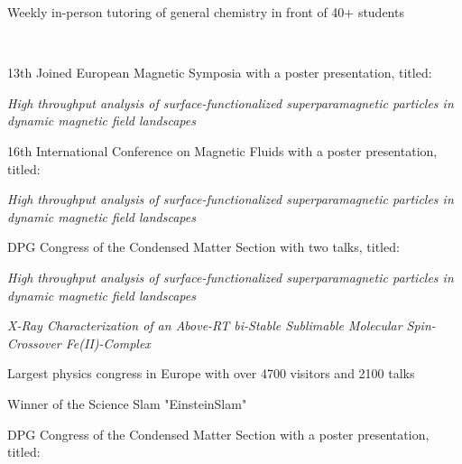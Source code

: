 \begin{adjustwidth}{2.5cm}{1.9cm}
\begin{tightemize}
Weekly in-person tutoring of general chemistry in front of 40+ students
\end{tightemize}

\sectionsep
{} \\
\begin{tightemize} \vspace{-3pt}
\item 13th Joined European Magnetic Symposia with a poster presentation, titled:


\textit{High throughput analysis of surface-functionalized superparamagnetic particles in dynamic magnetic field landscapes}

\end{tightemize}
\begin{tightemize} \vspace{-3pt}
\item 16th International Conference on Magnetic Fluids with a poster presentation, titled:


\textit{High throughput analysis of surface-functionalized superparamagnetic particles in dynamic magnetic field landscapes}

\end{tightemize}
\begin{tightemize} \vspace{-3pt}
\item DPG Congress of the Condensed Matter Section with two talks, titled:

\textit{High throughput analysis of surface-functionalized superparamagnetic
particles in dynamic magnetic field landscapes}


\textit{X-Ray Characterization of an Above-RT bi-Stable Sublimable Molecular Spin-Crossover Fe(II)-Complex}


Largest physics congress in Europe with over 4700 visitors and 2100 talks

Winner of the Science Slam "EinsteinSlam"
\end{tightemize}
\begin{tightemize} \vspace{-3pt}
\item DPG Congress of the Condensed Matter Section with a poster presentation, titled:



\end{tightemize}
\end{adjustwidth}
